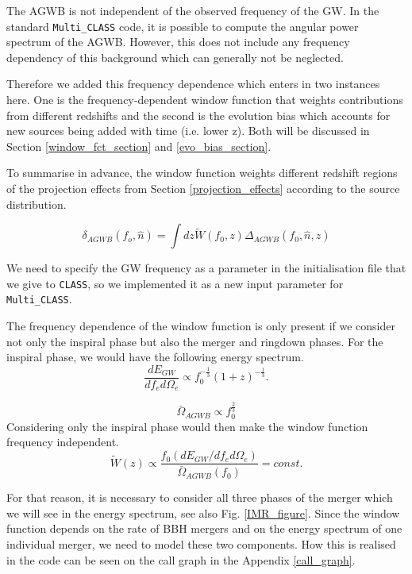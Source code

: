 The AGWB is not independent of the observed frequency of the GW. In the standard {\tt Multi\_CLASS} code, it is possible to compute the angular power spectrum of the AGWB. However, this does not include any frequency dependency of this background which can generally not be neglected. 

Therefore we added this frequency dependence which enters in two instances here. One is the frequency-dependent window function that weights contributions from different redshifts and the second is the evolution bias which accounts for new sources being added with time (i.e. lower z). Both will be discussed in Section \ref{window_fct_section} and \ref{evo_bias_section}.

To summarise in advance, the window function weights different redshift regions of the projection effects from Section \ref{projection_effects} according to the source distribution.

\begin{equation}
    \delta_{AGWB}(f_o, \hat{n})=\int dz \tilde{W}(f_0, z)\Delta_{AGWB}(f_0, \hat{n}, z)
\end{equation}

We need to specify the GW frequency as a parameter in the initialisation file that we give to {\tt CLASS}, so we implemented it as a new input parameter for {\tt Multi\_CLASS}.

The frequency dependence of the window function is only present if we consider not only the inspiral phase but also the merger and ringdown phases. For the inspiral phase, we would have the following energy spectrum.
\begin{equation}
    \frac{dE_{GW}}{df_e d\Omega_e} \propto f_0^{-\frac{1}{3}}(1+z)^{-\frac{1}{3}} .
\end{equation}

\begin{equation}
    \bar{\Omega}_{AGWB}\propto f_0^{\frac{2}{3}}
\end{equation}
Considering only the inspiral phase would then make the window function frequency independent.
\begin{equation}
    \tilde{W}(z)\propto \frac{f_0(d E_{GW}/df_e d\Omega_e)}{\bar{\Omega}_{AGWB}(f_0)} = const.
\end{equation}

For that reason, it is necessary to consider all three phases of the merger which we will see in the energy spectrum, see also Fig. \ref{IMR_figure}. Since the window function depends on the rate of BBH mergers and on the energy spectrum of one individual merger, we need to model these two components. How this is realised in the code can be seen on the call graph in the Appendix \ref{call_graph}.


